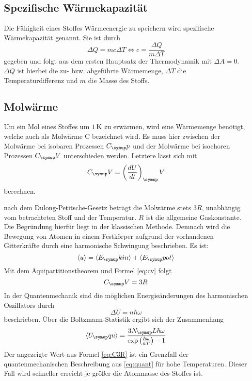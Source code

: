 \subsection{Spezifische Wärmekapazität}
Die Fähigkeit eines Stoffes Wärmeenergie zu speichern wird spezifische
Wärmekapazität genannt. Sie ist durch
\begin{equation}
  \Delta Q = mc\Delta T \Leftrightarrow c = \frac{\Delta Q}{m\Delta T}
\end{equation}
gegeben und folgt aus dem ersten Hauptsatz der Thermodynamik mit $\Delta A=0$.
$\Delta Q$ ist hierbei die zu- bzw. abgeführte Wärmemenge, $\Delta T$ die
Temperaturdifferenz und $m$ die Masse des Stoffs.
\subsection{Molwärme}
Um ein Mol eines Stoffes um $1\,\si{\kelvin}$ zu erwärmen, wird eine Wärmemenge benötigt,
welche auch als Molwärme C bezeichnet wird. Es muss hier zwischen der Molwärme
bei isobaren Prozessen $C_\su{p}$ und der Molwärme bei isochoren Prozessen
$C_\su{V}$ unterschieden werden. Letztere lässt sich mit
\begin{equation}
  C_\su{V}=\left(\frac{dU}{dt}\right)_\su{V}
  \label{eq:cv}
\end{equation}
berechnen.

nach dem Dulong-Petitsche-Gesetz beträgt die Molwärme stets $3R$, unabhängig
vom betrachteten Stoff und der Temperatur. $R$ ist die allgemeine Gaskonstante.
Die Begründung hierfür liegt in der klassischen Methode. Demnach wird die
Bewegung von Atomen in einem Festkörper aufgrund der vorhandenen Gitterkräfte
durch eine harmonische Schwingung beschrieben. Es ist:
\begin{equation}
  \langle u\rangle = \langle E_\su{kin}\rangle+\langle E_\su{pot}\rangle
\end{equation}
Mit dem Äquipartitionstheorem und Formel \eqref{eq:cv} folgt
\begin{equation}
  C_\su{V}= 3R
  \label{eq:C3R}
\end{equation}
In der Quantenmechanik sind die möglichen Energieänderungen des harmonischen
Oszillators durch
\begin{equation}
  \Delta U =n\hbar\omega
\end{equation}
beschrieben. Über die Boltzmann-Statistik ergibt sich der Zusammenhang
\begin{equation}
  \langle U_\su{qu}\rangle = \frac{3N_\su{L}\hbar\omega}{\exp{\left(\frac{\hbar
  \omega}{kT}\right)}-1}
  \label{eq:quant}
\end{equation}
Der angezeigte Wert aus Formel \eqref{eq:C3R} ist ein Grenzfall der
quantenmechanischen Beschreibung aus \eqref{eq:quant} für hohe Temperaturen.
Dieser Fall wird schneller erreicht je größer die Atommasse des Stoffes ist.
